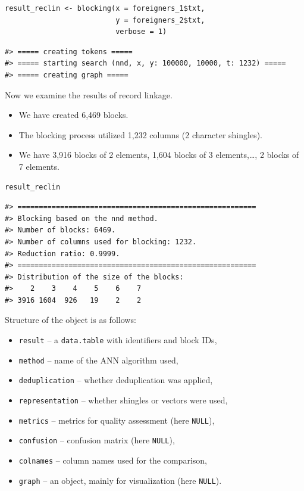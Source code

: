 \begin{verbatim}
result_reclin <- blocking(x = foreigners_1$txt,
                          y = foreigners_2$txt,
                          verbose = 1)
\end{verbatim}

\begin{verbatim}
#> ===== creating tokens =====
#> ===== starting search (nnd, x, y: 100000, 10000, t: 1232) =====
#> ===== creating graph =====
\end{verbatim}

Now we examine the results of record linkage.

\begin{itemize}
\tightlist
\item
  We have created 6,469 blocks.
\item
  The blocking process utilized 1,232 columns (2 character shingles).
\item
  We have 3,916 blocks of 2 elements, 1,604 blocks of 3 elements,\ldots, 2 blocks of 7 elements.
\end{itemize}

\begin{verbatim}
result_reclin
\end{verbatim}

\begin{verbatim}
#> ========================================================
#> Blocking based on the nnd method.
#> Number of blocks: 6469.
#> Number of columns used for blocking: 1232.
#> Reduction ratio: 0.9999.
#> ========================================================
#> Distribution of the size of the blocks:
#>    2    3    4    5    6    7 
#> 3916 1604  926   19    2    2
\end{verbatim}

Structure of the object is as follows:

\begin{itemize}
\tightlist
\item
  \texttt{result} -- a \texttt{data.table} with identifiers and block IDs,
\item
  \texttt{method} -- name of the ANN algorithm used,
\item
  \texttt{deduplication} -- whether deduplication was applied,
\item
  \texttt{representation} -- whether shingles or vectors were used,
\item
  \texttt{metrics} -- metrics for quality assessment (here \texttt{NULL}),
\item
  \texttt{confusion} -- confusion matrix (here \texttt{NULL}),
\item
  \texttt{colnames} -- column names used for the comparison,
\item
  \texttt{graph} -- an  object, mainly for visualization (here \texttt{NULL}).
\end{itemize}

